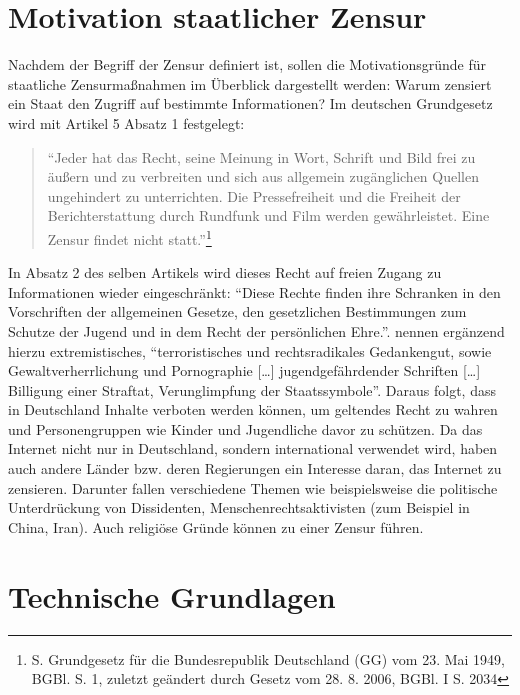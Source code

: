 \section{Motivation staatlicher Zensur}
Nachdem der Begriff der Zensur definiert ist, sollen die Motivationsgründe für staatliche Zensurmaßnahmen im Überblick dargestellt werden: Warum zensiert ein Staat den Zugriff auf bestimmte Informationen?
Im deutschen Grundgesetz wird mit Artikel 5 Absatz 1 festgelegt: \blockquote{\enquote{Jeder hat das Recht, seine Meinung in Wort, Schrift und Bild frei zu äußern und zu verbreiten und sich aus allgemein zugänglichen Quellen ungehindert zu unterrichten. Die Pressefreiheit und die Freiheit der Berichterstattung durch Rundfunk und Film werden gewährleistet. Eine Zensur findet nicht statt.}\footnote{S. Grundgesetz für die Bundesrepublik Deutschland (GG) vom 23. Mai 1949, BGBl. S. 1, zuletzt geändert durch Gesetz vom 28. 8. 2006, BGBl. I S. 2034}} In Absatz 2 des selben Artikels wird dieses Recht auf freien Zugang zu Informationen wieder eingeschränkt: \enquote{Diese Rechte finden ihre Schranken in den Vorschriften der allgemeinen Gesetze, den gesetzlichen Bestimmungen zum Schutze der Jugend und in dem Recht der persönlichen Ehre.}. \citeauthor{Rosenthal2003} nennen ergänzend hierzu extremistisches, \enquote{terroristisches und rechtsradikales Gedankengut, sowie Gewaltverherrlichung und Pornographie [\ldots] jugendgefährdender Schriften [\ldots] Billigung einer Straftat, Verunglimpfung der Staatssymbole}\autocite[16]{Rosenthal2003}. Daraus folgt, dass in Deutschland Inhalte verboten werden können, um geltendes Recht zu wahren und Personengruppen wie Kinder und Jugendliche davor zu schützen.
Da das Internet nicht nur in Deutschland, sondern international verwendet wird, haben auch andere Länder bzw. deren Regierungen ein Interesse daran, das Internet zu zensieren. Darunter fallen verschiedene Themen wie beispielsweise die politische Unterdrückung von Dissidenten, Menschenrechtsaktivisten (zum Beispiel in China, Iran). Auch religiöse Gründe können zu einer Zensur führen\autocite[Vgl][3f]{Warf2010}. 
\section{Technische Grundlagen}\label{technischeGrundlagen}
